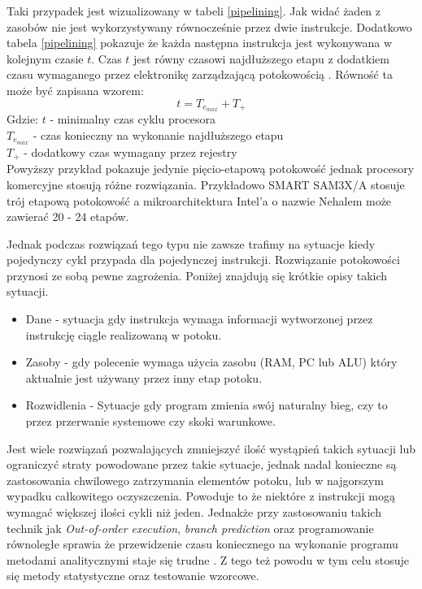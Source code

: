 Taki przypadek jest wizualizowany w tabeli \ref{pipelining}. Jak widać żaden z zasobów nie jest wykorzystywany równocześnie przez dwie instrukcje.
Dodatkowo tabela \ref{pipelining} pokazuje że każda następna instrukcja jest wykonywana w kolejnym czasie $t$. 
Czas $t$ jest równy czasowi najdłuższego etapu z dodatkiem czasu wymaganego przez elektronikę zarządzającą potokowością \cite{arch}.
Równość ta może być zapisana wzorem:
\begin{equation}
        t = T_{e_{max}} + T_{+}
\end{equation}
Gdzie:
        $t$ - minimalny czas cyklu procesora \\
        $T_{e_{max}}$ - czas konieczny na wykonanie najdłuższego etapu \\
        $T_{+}$ - dodatkowy czas wymagany przez rejestry \\


Powyższy przykład pokazuje jedynie pięcio-etapową potokowość jednak procesory komercyjne stosują różne rozwiązania. Przykładowo SMART SAM3X/A stosuje trój etapową potokowość\cite{datasheet} a mikroarchitektura Intel'a o nazwie Nehalem może zawierać 20 - 24 etapów\cite{pipelining intel}.

Jednak podczas rozwiązań tego typu nie zawsze trafimy na sytuacje kiedy pojedynczy cykl przypada dla pojedynczej instrukcji. 
Rozwiązanie potokowości przynosi ze sobą pewne zagrożenia. Poniżej znajdują się krótkie opisy takich sytuacji. 

\begin{itemize}
        \item Dane - sytuacja gdy instrukcja wymaga informacji wytworzonej przez instrukcję ciągle realizowaną w potoku. 
        \item Zasoby - gdy polecenie wymaga użycia zasobu (RAM, PC lub ALU) który aktualnie jest używany przez inny etap potoku. 
        \item Rozwidlenia - Sytuacje gdy program zmienia swój naturalny bieg, czy to przez przerwanie systemowe czy skoki warunkowe. 
\end{itemize}

Jest wiele rozwiązań pozwalających zmniejszyć ilość wystąpień takich sytuacji lub ograniczyć straty powodowane przez takie sytuacje, jednak nadal konieczne są zastosowania chwilowego zatrzymania elementów potoku, lub w najgorszym wypadku całkowitego oczyszczenia.
Powoduje to że niektóre z instrukcji mogą wymagać większej ilości cykli niż jeden. Jednakże przy zastosowaniu takich technik jak
\textit{Out-of-order execution}, \textit{branch prediction} oraz programowanie równoległe  sprawia że przewidzenie czasu koniecznego na wykonanie programu metodami analitycznymi staje się trudne . 
Z tego też powodu w tym celu stosuje się metody statystyczne oraz testowanie wzorcowe. 

